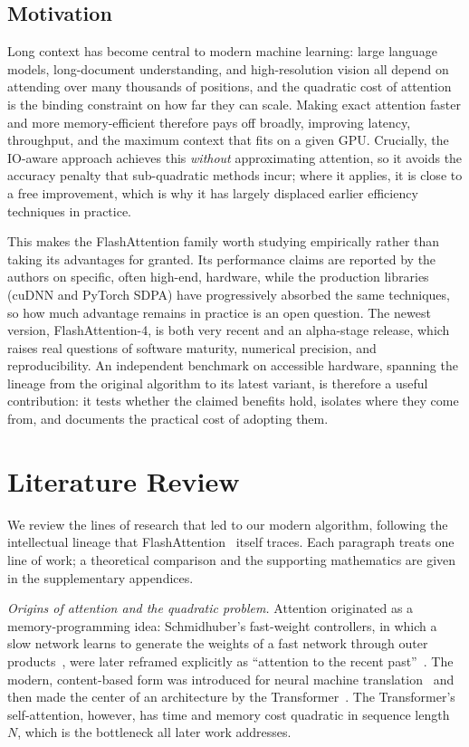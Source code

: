 \documentclass[sigconf,nonacm]{acmart}
\newcommand{\lead}[1]{\textit{#1}\quad}
\begin{document}
\subsection{Motivation}
Long context has become central to modern machine learning: large language
models, long-document understanding, and high-resolution vision all depend on
attending over many thousands of positions, and the quadratic cost of attention
is the binding constraint on how far they can scale. Making exact attention
faster and more memory-efficient therefore pays off broadly, improving latency,
throughput, and the maximum context that fits on a given GPU. Crucially, the
IO-aware approach achieves this \emph{without} approximating attention, so it
avoids the accuracy penalty that sub-quadratic methods incur; where it applies,
it is close to a free improvement, which is why it has largely displaced earlier
efficiency techniques in practice.

This makes the FlashAttention family worth studying empirically rather than
taking its advantages for granted. Its performance claims are reported by the
authors on specific, often high-end, hardware, while the production libraries
(cuDNN and PyTorch SDPA) have progressively absorbed the same techniques, so how
much advantage remains in practice is an open question. The newest version,
FlashAttention-4, is both very recent and an alpha-stage release, which raises
real questions of software maturity, numerical precision, and reproducibility. An
independent benchmark on accessible hardware, spanning the lineage from the
original algorithm to its latest variant, is therefore a useful contribution: it
tests whether the claimed benefits hold, isolates where they come from, and
documents the practical cost of adopting them.

\section{Literature Review}
\label{sec:litreview}
We review the lines of research that led to our modern algorithm, following the
intellectual lineage that FlashAttention~\cite{dao2022flashattention} itself
traces. Each paragraph treats one line of work; a theoretical comparison and the
supporting mathematics are given in the supplementary appendices.

\lead{Origins of attention and the quadratic problem.}
Attention originated as a memory-programming idea: Schmidhuber's fast-weight
controllers, in which a slow network learns to generate the weights of a fast
network through outer products~\cite{schmidhuber1992fastweights}, were later
reframed explicitly as ``attention to the recent past''~\cite{ba2016fastweights}.
The modern, content-based form was introduced for neural machine
translation~\cite{bahdanau2015nmt} and then made the center of an architecture by
the Transformer~\cite{vaswani2017attention}. The Transformer's self-attention,
however, has time and memory cost quadratic in sequence length $N$, which is the
bottleneck all later work addresses.
\end{document}

